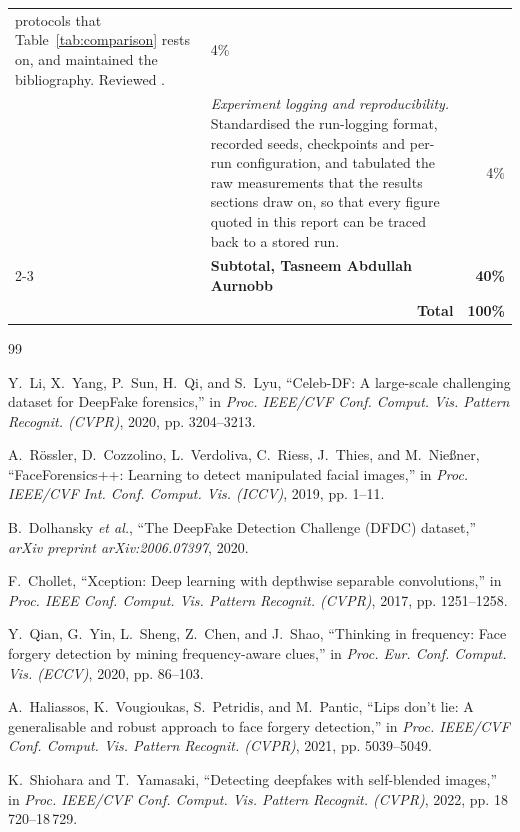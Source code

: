 \documentclass[journal,onecolumn]{IEEEtran}
\begin{document}
{\begin{longtable}{p{30mm}p{88mm}r}
protocols that Table~\ref{tab:comparison} rests on, and maintained the
bibliography. Reviewed \cite{haliassos2021lips}. & 4\% \\
\addlinespace
&
\emph{Experiment logging and reproducibility.} Standardised the run-logging
format, recorded seeds, checkpoints and per-run configuration, and tabulated the
raw measurements that the results sections draw on, so that every figure quoted
in this report can be traced back to a stored run. & 4\% \\
\cmidrule(l){2-3}
& \textbf{Subtotal, Tasneem Abdullah Aurnobb} & \textbf{40\%} \\
\midrule
\multicolumn{2}{r}{\textbf{Total}} & \textbf{100\%} \\
\end{longtable}
}

{\footnotesize
\begin{thebibliography}{99}
\itemsep 0pt

Y.~Li, X.~Yang, P.~Sun, H.~Qi, and S.~Lyu, ``Celeb-DF: A large-scale challenging dataset for DeepFake forensics,'' in \emph{Proc. IEEE/CVF Conf. Comput. Vis. Pattern Recognit. (CVPR)}, 2020, pp. 3204--3213.

A.~R{\"o}ssler, D.~Cozzolino, L.~Verdoliva, C.~Riess, J.~Thies, and M.~Nie{\ss}ner, ``FaceForensics++: Learning to detect manipulated facial images,'' in \emph{Proc. IEEE/CVF Int. Conf. Comput. Vis. (ICCV)}, 2019, pp. 1--11.

B.~Dolhansky \emph{et al.}, ``The DeepFake Detection Challenge (DFDC) dataset,'' \emph{arXiv preprint arXiv:2006.07397}, 2020.

F.~Chollet, ``Xception: Deep learning with depthwise separable convolutions,'' in \emph{Proc. IEEE Conf. Comput. Vis. Pattern Recognit. (CVPR)}, 2017, pp. 1251--1258.

Y.~Qian, G.~Yin, L.~Sheng, Z.~Chen, and J.~Shao, ``Thinking in frequency: Face forgery detection by mining frequency-aware clues,'' in \emph{Proc. Eur. Conf. Comput. Vis. (ECCV)}, 2020, pp. 86--103.

A.~Haliassos, K.~Vougioukas, S.~Petridis, and M.~Pantic, ``Lips don't lie: A generalisable and robust approach to face forgery detection,'' in \emph{Proc. IEEE/CVF Conf. Comput. Vis. Pattern Recognit. (CVPR)}, 2021, pp. 5039--5049.

K.~Shiohara and T.~Yamasaki, ``Detecting deepfakes with self-blended images,'' in \emph{Proc. IEEE/CVF Conf. Comput. Vis. Pattern Recognit. (CVPR)}, 2022, pp. 18\,720--18\,729.


\end{thebibliography}}
\end{document}

